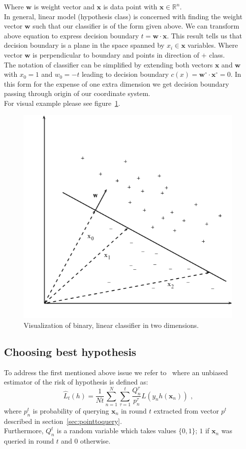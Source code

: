 \documentclass[12pt, a4paper, pdflatex, leqno]{report}
\begin{document}
Where $\mathbf{w}$ is weight vector and $\mathbf{x}$ is data point with $\mathbf{x} \in \mathbb{R}^n$.\\
In general, linear model (hypothesis class) is concerned with finding the weight vector $\mathbf{w}$ such that our classifier is of the form given above. We can transform above equation to express decision boundary $t = \mathbf{w} \cdot \mathbf{x}$. This result tells us that decision boundary is a plane in the space spanned by $x_i \in \mathbf{x}$ variables. Where vector $\mathbf{w}$ is perpendicular to boundary and points in direction of $+$ class.\\
The notation of classifier can be simplified by extending both vectors $\mathbf{x}$ and $\mathbf{w}$ with $x_0 = 1$ and $w_0 = -t$ leading to decision boundary $c(x) = \mathbf{w}^{\circ} \cdot \mathbf{x}^{\circ} = 0$. In this form for the expense of one extra dimension we get decision boundary passing through origin of our coordinate system.\\
For visual example please see figure~\ref{fig:binclas}.\\

\begin{figure}[htbp]
  \centering
  \includegraphics[width=0.5\linewidth]{graphics/binclas.png}
  \begin{tiny}
    \caption{Visualization of binary, linear classifier in two dimensions.\label{fig:binclas}}
  \end{tiny}
  \vspace{1cm}
\end{figure}

\subsection{Choosing best hypothesis\label{sec:risk}}
To address the first mentioned above issue we refer to~\citep{DBLP:journals/corr/GantiG13} where an unbiased estimator of the risk of hypothesis is defined as:\\
\begin{equation}\label{eq:mean}
\hat{L}_t(h) = \frac{1}{Nt} \sum_{n=1}^{N} \sum_{\tau = 1}^{t} \frac{Q^{\tau}_n}{p^{\tau}_n} L(y_n h(\mathbf{x}_n)) \text{~,}
\end{equation}
where $p^t_n$ is probability of querying $\mathbf{x}_n$ in round $t$ extracted from vector $p^t$ described in section~\ref{sec:pointtoquery}.\\
Furthermore, $Q^t_n$ is a random variable which takes values $\{0,1\}$; $1$ if $\mathbf{x}_n$ was queried in round $t$ and $0$ otherwise.\\
\end{document}
